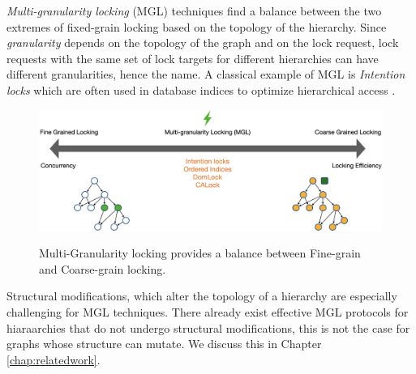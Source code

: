 

\emph{Multi-granularity locking} (MGL) \cite{gray1975granularity} techniques find a balance between the two extremes of fixed-grain locking based on the topology of the hierarchy.
Since \emph{granularity} depends on the topology of the graph and on the lock request, lock requests with the same set of lock targets for different hierarchies can have different granularities, hence the name. A classical example of MGL is \emph{Intention locks} \cite{StonebrakerGranularity} which are often used in database indices to optimize hierarchical access \cite{sqlintentionlocks}. 

\begin{figure}[h]
    \captionsetup{justification=centering}
    \includegraphics[width=\textwidth]{figures/MGLSpectrum.png}
    \label{fig:mglspectrum}
    \caption{Multi-Granularity locking provides a balance between Fine-grain and Coarse-grain locking.}
\end{figure}


Structural modifications, which alter the topology of a hierarchy are especially challenging for MGL techniques. 
There already exist effective MGL protocols for hiaraarchies that do not undergo structural modifications, this is not the case for graphs whose structure can mutate. 
We discuss this in Chapter \ref{chap:relatedwork}.




